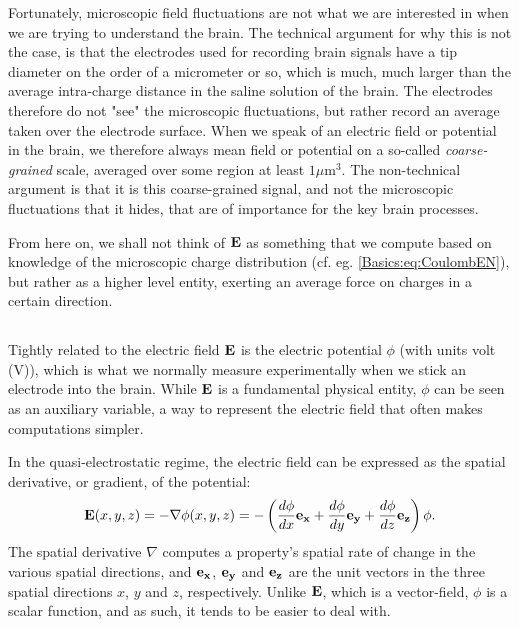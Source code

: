 Fortunately, microscopic field fluctuations are not what we are interested in when we are trying to understand the brain. The technical argument for why this is not the case, is that the electrodes used for recording brain signals have a tip diameter on the order of a micrometer or so, which is much, much larger than the average intra-charge distance in the saline solution of the brain. The electrodes therefore do not "see" the microscopic fluctuations, but rather record an average taken over the electrode surface. When we speak of an electric field or potential in the brain, we therefore always mean field or potential on a so-called \textit{coarse-grained} scale, averaged over some region at least $1 \mu$m$^3$. The non-technical argument is that it is this coarse-grained signal, and not the microscopic fluctuations that it hides, that are of importance for the key brain processes. 

From here on, we shall not think of ${\bf E}$ as something that we compute based on
knowledge of the microscopic charge distribution (cf. eg. \ref{Basics:eq:CoulombEN}), but rather as a higher level entity, exerting an average force on charges in a certain direction.


\subsection{}
Tightly related to the electric field ${\bf E}$ is the electric potential $\phi$ (with units volt (V)), which is what we normally measure experimentally when we stick an electrode into the brain. While ${\bf E}$ is a fundamental physical entity, $\phi$ can be seen as an auxiliary variable, a way to represent the electric field that often makes computations simpler. 

In the quasi-electrostatic regime, the electric field can be expressed as the spatial derivative, or gradient, of the potential:
\begin{equation}
{\bf E}(x,y,z) = - \nabla \phi(x,y,z) = - \left(\frac{d\phi}{dx} {\bf e_x}  + \frac{d\phi}{dy} {\bf e_y} + \frac{d\phi}{dz} {\bf e_z} \right) \phi.
\label{Basics:eq:EV}
\end{equation}
The spatial derivative $\nabla$ computes a property's spatial rate of change in the various spatial directions, and ${\bf e_x}$, ${\bf e_y}$ and  ${\bf e_z}$ are the unit vectors in the three spatial directions $x$, $y$ and $z$, respectively. Unlike ${\bf E}$, which is a vector-field, $\phi$ is a scalar function, and as such, it tends to be easier to deal with.

